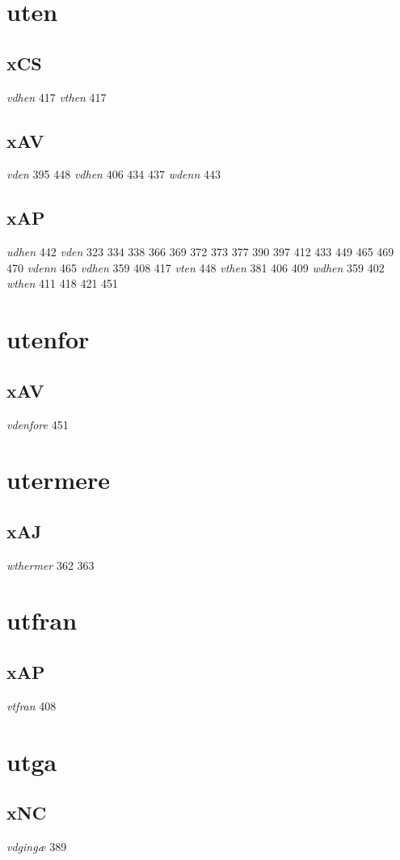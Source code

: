 \documentclass[a4paper,twocolumn]{article}
\begin{document}
\section{uten}
\label{sec:org0046721}
\subsection{xCS}
\label{sec:org2e70088}
\emph{vdhen} 417 \emph{vthen} 417 
\subsection{xAV}
\label{sec:org200aba1}
\emph{vden} 395 448 \emph{vdhen} 406 434 437 \emph{wdenn} 443 
\subsection{xAP}
\label{sec:org01d3ecc}
\emph{udhen} 442 \emph{vden} 323 334 338 366 369 372 373 377 390 397 412 433 449 465 469 470 \emph{vdenn} 465 \emph{vdhen} 359 408 417 \emph{vten} 448 \emph{vthen} 381 406 409 \emph{wdhen} 359 402 \emph{wthen} 411 418 421 451 
\section{utenfor}
\label{sec:org10c2277}
\subsection{xAV}
\label{sec:org38b21c7}
\emph{vdenfore} 451 
\section{utermere}
\label{sec:org9813f10}
\subsection{xAJ}
\label{sec:org47dab31}
\emph{wthermer} 362 363 
\section{utfran}
\label{sec:orgbabf71f}
\subsection{xAP}
\label{sec:org6de1553}
\emph{vtfran} 408 
\section{utga}
\label{sec:org00dfaf1}
\subsection{xNC}
\label{sec:org90b4c0b}
\emph{vdgingæ} 389 
\end{document}

